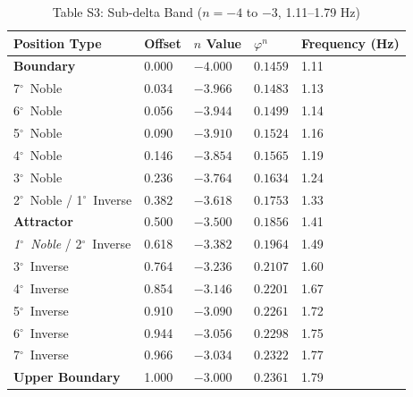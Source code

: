\documentclass[11pt,a4paper]{article}
\newcommand{\degree}{$^\circ$}  %
\begin{document}
\begin{table}[H]
\centering
\caption*{Table S3: Sub-delta Band ($n = -4$ to $-3$, 1.11--1.79 Hz)}
\begin{tabular}{@{}lllll@{}}
\toprule
Position Type & Offset & $n$ Value & $\varphi^n$ & Frequency (Hz) \\
\midrule
\textbf{Boundary} & 0.000 & $-4.000$ & $0.1459$ & 1.11 \\
7\degree\ Noble & 0.034 & $-3.966$ & $0.1483$ & 1.13 \\
6\degree\ Noble & 0.056 & $-3.944$ & $0.1499$ & 1.14 \\
5\degree\ Noble & 0.090 & $-3.910$ & $0.1524$ & 1.16 \\
4\degree\ Noble & 0.146 & $-3.854$ & $0.1565$ & 1.19 \\
3\degree\ Noble & 0.236 & $-3.764$ & $0.1634$ & 1.24 \\
2\degree\ Noble / 1\degree\ Inverse & 0.382 & $-3.618$ & $0.1753$ & 1.33 \\
\textbf{Attractor} & 0.500 & $-3.500$ & $0.1856$ & 1.41 \\
\textit{1\degree\ Noble} / 2\degree\ Inverse & 0.618 & $-3.382$ & $0.1964$ & 1.49 \\
3\degree\ Inverse & 0.764 & $-3.236$ & $0.2107$ & 1.60 \\
4\degree\ Inverse & 0.854 & $-3.146$ & $0.2201$ & 1.67 \\
5\degree\ Inverse & 0.910 & $-3.090$ & $0.2261$ & 1.72 \\
6\degree\ Inverse & 0.944 & $-3.056$ & $0.2298$ & 1.75 \\
7\degree\ Inverse & 0.966 & $-3.034$ & $0.2322$ & 1.77 \\
\textbf{Upper Boundary} & 1.000 & $-3.000$ & $0.2361$ & 1.79 \\
\bottomrule
\end{tabular}
\end{table}
\end{document}
